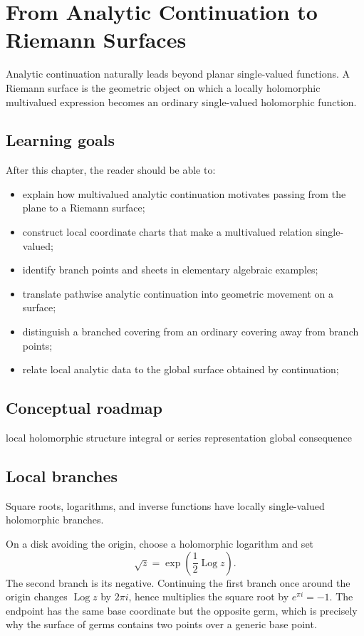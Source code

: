 \chapter{From Analytic Continuation to Riemann Surfaces}
\label{ch:iv22}

Analytic continuation naturally leads beyond planar single-valued functions. A Riemann surface is the geometric object on which a locally holomorphic multivalued expression becomes an ordinary single-valued holomorphic function.

\section*{Learning goals}
After this chapter, the reader should be able to:
\begin{itemize}
\item explain how multivalued analytic continuation motivates passing from the plane to a Riemann surface;
\item construct local coordinate charts that make a multivalued relation single-valued;
\item identify branch points and sheets in elementary algebraic examples;
\item translate pathwise analytic continuation into geometric movement on a surface;
\item distinguish a branched covering from an ordinary covering away from branch points;
\item relate local analytic data to the global surface obtained by continuation;
\end{itemize}
\section*{Conceptual roadmap}
\volroadmap
  {local holomorphic structure}
  {integral or series representation}
  {global consequence}

\section{Local branches}
Square roots, logarithms, and inverse functions have locally single-valued holomorphic branches.

\begin{example}\label{ex:iv22-expand-01}
On a disk avoiding the origin, choose a holomorphic logarithm and set
\[
\sqrt z=\exp\!\left(\frac12\operatorname{Log}z\right).
\]
The second branch is its negative. Continuing the first branch once around the origin changes \(\operatorname{Log}z\) by \(2\pi i\), hence multiplies the square root by \(e^{\pi i}=-1\). The endpoint has the same base coordinate but the opposite germ, which is precisely why the surface of germs contains two points over a generic base point.
\end{example}

